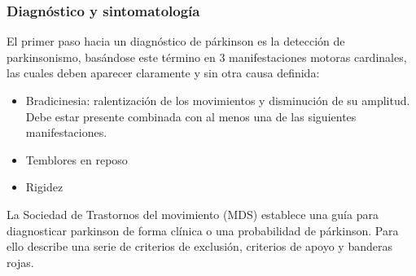 \subsubsection{Diagnóstico y sintomatología}
El primer paso hacia un diagnóstico de párkinson es la detección de parkinsonismo, basándose este término en 3 manifestaciones motoras cardinales, las cuales deben aparecer claramente y sin otra causa definida\cite{postuma2015mds}: 
\begin{itemize}
    \item Bradicinesia: ralentización de los movimientos y disminución de su amplitud. Debe estar presente combinada con al menos una de las siguientes manifestaciones.
    \item Temblores en reposo
    \item Rigidez
\end{itemize}
La Sociedad de Trastornos del movimiento (MDS) establece una guía para diagnosticar parkinson de forma clínica o una probabilidad de párkinson. Para ello describe 
una serie de criterios de exclusión, criterios de apoyo y banderas rojas.\cite{postuma2015mds}


